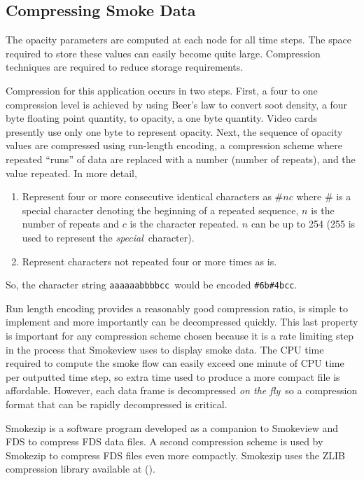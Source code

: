 %
%

\subsection{Compressing Smoke Data}

The opacity parameters are computed at each node for all time
steps. The space required to store these values
can easily become quite large. Compression techniques are required to reduce storage
requirements.

Compression for this application occurs in two steps.  First, a
four to one compression level is achieved by using Beer's law to
convert soot density, a four byte floating point quantity, to
opacity, a one byte quantity.  Video cards presently use only one
byte to represent opacity. Next, the sequence of opacity values
are compressed using run-length encoding, a compression scheme where
repeated ``runs'' of data are replaced with a number (number of repeats),
and the value repeated.  In more detail,


\begin{enumerate}
\item Represent four or more consecutive identical characters as
$\# n c$ where $\#$ is a special character denoting the beginning
of a repeated sequence, $n$ is the number of repeats and $c$ is
the character repeated.  $n$ can be up to 254 (255 is used to
represent the {\em special}\ character). \item Represent
characters not repeated four or more times as is.
\end{enumerate}

So, the character string {\tt aaaaaabbbbcc}\ would be encoded {\tt \#6b\#4bcc}.

Run length encoding provides a reasonably good compression ratio,
is simple to implement and more importantly can be decompressed
quickly. This last property is important for any compression
scheme chosen because it is a rate limiting step in the process
that Smokeview uses to display smoke data. The CPU time required
to compute the smoke flow can easily exceed one minute of CPU time
per outputted time step, so extra time used to produce a more
compact file is affordable. However, each data frame is
decompressed {\em on the fly}\ so a compression format that can be
rapidly decompressed is critical.

Smokezip is a software program developed as a companion to
Smokeview and FDS to compress FDS data files. A second compression
scheme is used by Smokezip to compress FDS files even more
compactly.  Smokezip uses the ZLIB compression library available
at ().


